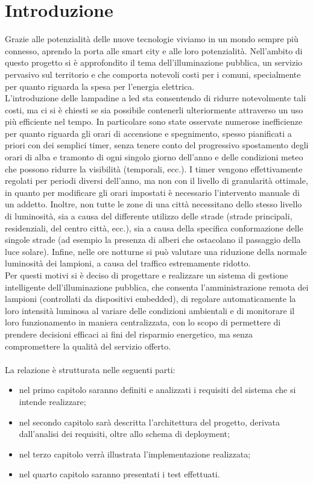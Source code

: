 \chapter{Introduzione}

Grazie alle potenzialità delle nuove tecnologie viviamo in un mondo sempre più connesso, aprendo la porta alle smart city e alle loro potenzialità.
Nell'ambito di questo progetto si è approfondito il tema dell'illuminazione pubblica, un servizio pervasivo sul territorio e che comporta notevoli costi per i comuni, specialmente per quanto riguarda la spesa per l'energia elettrica.
\\L'introduzione delle lampadine a led sta consentendo di ridurre notevolmente tali costi, ma ci si è chiesti se sia possibile contenerli ulteriormente attraverso un uso più efficiente nel tempo.
In particolare sono state osservate numerose inefficienze per quanto riguarda gli orari di accensione e spegnimento, spesso pianificati a priori con dei semplici timer, senza tenere conto del progressivo spostamento degli orari di alba e tramonto di ogni singolo giorno dell'anno e delle condizioni meteo che possono ridurre la visibilità (temporali, ecc.).
I timer vengono effettivamente regolati per periodi diversi dell'anno, ma non con il livello di granularità ottimale, in quanto per modificare gli orari impostati è necessario l'intervento manuale di un addetto.
Inoltre, non tutte le zone di una città necessitano dello stesso livello di luminosità, sia a causa del differente utilizzo delle strade (strade principali, residenziali, del centro città, ecc.), sia a causa della specifica conformazione delle singole strade (ad esempio la presenza di alberi che ostacolano il passaggio della luce solare).
Infine, nelle ore notturne si può valutare una riduzione della normale luminosità dei lampioni, a causa del traffico estremamente ridotto.
\\Per questi motivi si è deciso di progettare e realizzare un sistema di gestione intelligente dell'illuminazione pubblica, che consenta l'amministrazione remota dei lampioni (controllati da dispositivi embedded), di regolare automaticamente la loro intensità luminosa al variare delle condizioni ambientali e di monitorare il loro funzionamento in maniera centralizzata, con lo scopo di permettere di prendere decisioni efficaci ai fini del risparmio energetico, ma senza compromettere la qualità del servizio offerto.
\\\\La relazione è strutturata nelle seguenti parti:
\begin{itemize}
 \item nel primo capitolo saranno definiti e analizzati i requisiti del sistema che si intende realizzare;
 \item nel secondo capitolo sarà descritta l'architettura del progetto, derivata dall'analisi dei requisiti, oltre allo schema di deployment;
 \item nel terzo capitolo verrà illustrata l'implementazione realizzata;
 \item nel quarto capitolo saranno presentati i test effettuati.
\end{itemize}
